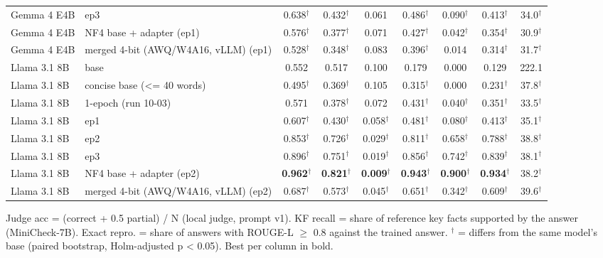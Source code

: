 \begin{table}[t]
{\begin{tabular}{llccccccc}
Gemma 4 E4B & ep3 & 0.638$^\dagger$ & 0.432$^\dagger$ & 0.061 & 0.486$^\dagger$ & 0.090$^\dagger$ & 0.413$^\dagger$ & 34.0$^\dagger$ \\
Gemma 4 E4B & NF4 base + adapter (ep1) & 0.576$^\dagger$ & 0.377$^\dagger$ & 0.071 & 0.427$^\dagger$ & 0.042$^\dagger$ & 0.354$^\dagger$ & 30.9$^\dagger$ \\
Gemma 4 E4B & merged 4-bit (AWQ/W4A16, vLLM) (ep1) & 0.528$^\dagger$ & 0.348$^\dagger$ & 0.083 & 0.396$^\dagger$ & 0.014 & 0.314$^\dagger$ & 31.7$^\dagger$ \\
Llama 3.1 8B & base & 0.552 & 0.517 & 0.100 & 0.179 & 0.000 & 0.129 & 222.1 \\
Llama 3.1 8B & concise base (<= 40 words) & 0.495$^\dagger$ & 0.369$^\dagger$ & 0.105 & 0.315$^\dagger$ & 0.000 & 0.231$^\dagger$ & 37.8$^\dagger$ \\
Llama 3.1 8B & 1-epoch (run 10-03) & 0.571 & 0.378$^\dagger$ & 0.072 & 0.431$^\dagger$ & 0.040$^\dagger$ & 0.351$^\dagger$ & 33.5$^\dagger$ \\
Llama 3.1 8B & ep1 & 0.607$^\dagger$ & 0.430$^\dagger$ & 0.058$^\dagger$ & 0.481$^\dagger$ & 0.080$^\dagger$ & 0.413$^\dagger$ & 35.1$^\dagger$ \\
Llama 3.1 8B & ep2 & 0.853$^\dagger$ & 0.726$^\dagger$ & 0.029$^\dagger$ & 0.811$^\dagger$ & 0.658$^\dagger$ & 0.788$^\dagger$ & 38.8$^\dagger$ \\
Llama 3.1 8B & ep3 & 0.896$^\dagger$ & 0.751$^\dagger$ & 0.019$^\dagger$ & 0.856$^\dagger$ & 0.742$^\dagger$ & 0.839$^\dagger$ & 38.1$^\dagger$ \\
Llama 3.1 8B & NF4 base + adapter (ep2) & \textbf{0.962$^\dagger$} & \textbf{0.821$^\dagger$} & \textbf{0.009$^\dagger$} & \textbf{0.943$^\dagger$} & \textbf{0.900$^\dagger$} & \textbf{0.934$^\dagger$} & 38.2$^\dagger$ \\
Llama 3.1 8B & merged 4-bit (AWQ/W4A16, vLLM) (ep2) & 0.687$^\dagger$ & 0.573$^\dagger$ & 0.045$^\dagger$ & 0.651$^\dagger$ & 0.342$^\dagger$ & 0.609$^\dagger$ & 39.6$^\dagger$ \\
\bottomrule
\end{tabular}}
\par\smallskip\footnotesize Judge acc = (correct + 0.5 partial) / N (local judge, prompt v1). KF recall = share of reference key facts supported by the answer (MiniCheck-7B). Exact repro. = share of answers with ROUGE-L $\geq$ 0.8 against the trained answer. $^\dagger$ = differs from the same model's base (paired bootstrap, Holm-adjusted p < 0.05). Best per column in bold.
\end{table}
